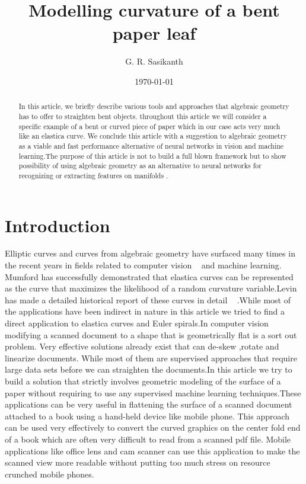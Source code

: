 \documentclass[longbibliography]{revtex4-1}
\begin{document}
\title{Modelling curvature of a bent paper leaf}
\author{G. R. Sasikanth}
\date{\today}
\begin{abstract}
 In this article, we briefly describe various tools and approaches that algebraic geometry has to offer to straighten bent objects.
 throughout this article we will consider a specific example of a bent or curved piece of paper which in our case acts very much like an     
 elastica curve. We conclude this article
 with a suggestion to algebraic geometry as a viable and fast performance alternative of neural networks in vision and
 machine learning.The purpose of this article is not to build a full blown framework but to show possibility of using 
 algebraic geometry as an alternative to neural networks for recognizing or extracting features on manifolds .
\end{abstract}
\maketitle

\section{Introduction}
Elliptic curves and curves from algebraic geometry have surfaced many times in the recent years in fields related to computer vision ~\cite{Mumford} and machine learning. Mumford has successfully demonstrated that elastica curves can be represented as the curve that maximizes the likelihood of a random curvature variable.Levin has made a detailed historical report of these curves in detail ~\cite{Levien} .While most of the applications have been indirect in nature in this article we tried to find a direct application to
elastica curves and Euler spirals.In computer vision modifying a scanned document to a shape that is geometrically flat is a sort out problem. Very effective solutions already exist that can de-skew ,rotate and linearize documents. While most of them are supervised approaches that require large data sets before we can straighten the documents.In this article we try to build a solution that strictly involves geometric modeling of the surface of a paper without requiring to use any supervised machine learning techniques.These applications can be very useful in flattening the surface of a scanned document attached to a book using a hand-held device like mobile phone. This approach can be used very effectively to convert the curved graphics on the center fold end of a book which are often very difficult to read from a scanned pdf file. Mobile applications like office lens and cam scanner can use this application to make the scanned view more readable without putting too much stress on resource crunched mobile phones.
\end{document}

